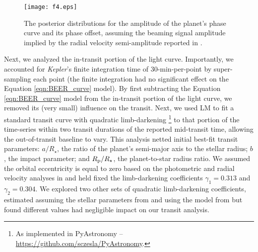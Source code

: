 \documentclass[manuscript]{aastex62}
\newcommand{\kepler}{{\it Kepler}}
\begin{document}
\begin{figure}
\texttt{[image: f4.eps]}
\caption{The posterior distributions for the amplitude of the planet's phase curve and its phase offset, assuming the beaming signal amplitude implied by the radial velocity semi-amplitude reported in \citet{2013ApJ...771...26F}. \label{fig:Aplanet-delta-fit-params_Analysis-of-Kepler76b}}
\end{figure}

Next, we analyzed the in-transit portion of the light curve. Importantly, we accounted for \kepler's finite integration time of 30-min-per-point by super-sampling each point (the finite integration had no significant effect on the Equation \ref{eqn:BEER_curve} model). By first subtracting the Equation \ref{eqn:BEER_curve} model from the in-transit portion of the light curve, we removed its (very small) influence on the transit. Next, we used LM to fit a standard transit curve with quadratic limb-darkening \citep{2002ApJ...580L.171M}\footnote{As implemented in PyAstronomy -- \url{https://github.com/sczesla/PyAstronomy}.} to that portion of the time-series within two transit durations of the reported mid-transit time, allowing the out-of-transit baseline to vary. This analysis netted initial best-fit transit parameters: $a/R_\star$, the ratio of the planet's semi-major axis to the stellar radius; $b$, the impact parameter; and $R_{\rm p}/R_\star$, the planet-to-star radius ratio. We assumed the orbital eccentricity is equal to zero based on the photometric and radial velocity analyses in \citet{2013ApJ...771...26F} and held fixed the limb-darkening coefficients $\gamma_1 = 0.313$ and $\gamma_2 = 0.304$. We explored two other sets of quadratic limb-darkening coefficients, estimated assuming the stellar parameters from \citet{2013ApJ...771...26F} and using the model from \citet{2015MNRAS.450.1879E} but found different values had negligible impact on our transit analysis. 
\end{document}
